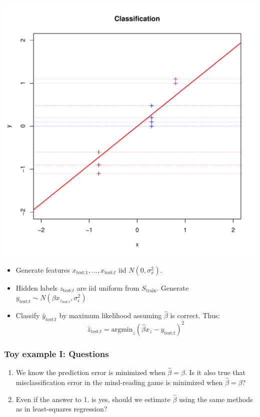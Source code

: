 \documentclass{beamer}
\begin{document}
\begin{frame}
\begin{center}
\includegraphics[scale = 0.2]{ti8.pdf}
\end{center}
\begin{itemize}
\item
Generate features $x_{\text{test:} 1}, \hdots,
x_{\text{test:} \ell}$ iid $N(0, \sigma^2_x)$.
\item
Hidden labels  $z_{\text{test:} t}$ are iid uniform from $S_{\text{train}}$.
Generate $y_{\text{test:} t} \sim N(\beta x_{z_{\text{test:} t}}, \sigma^2_\epsilon)$
\item
Classify $\hat{y}_{\text{test:} t}$ by maximum likelihood assuming
$\hat{\beta}$ is correct.  Thus:
\[
\hat{z}_{\text{test:} t} = \text{argmin}_{z} (\hat{\beta} x_z -
y_{\text{test:} t})^2
\]
\end{itemize}
\end{frame}

\begin{frame}
\frametitle{Toy example I: Questions}
\begin{enumerate}
\item
We know the prediction error is minimized when $\hat{\beta} = \beta$.
Is it also true that misclassification error in the mind-reading game
is minimized when $\hat{\beta} = \beta$?
\item
Even if the answer to 1. is yes, should we estimate $\hat{\beta}$
using the same methods as in least-squares regression?
\end{enumerate}
\end{frame}
\end{document}
